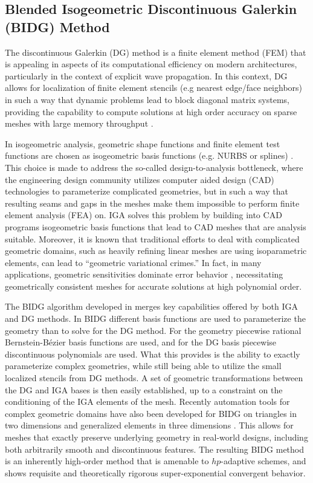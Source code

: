 \subsection{Blended Isogeometric Discontinuous Galerkin (BIDG) Method}
\label{sec:isogeometric}

The discontinuous Galerkin (DG) method is a finite element method (FEM) that is appealing in
aspects of its computational efficiency on modern architectures,
particularly in the context of explicit wave propagation.  In this context, DG allows for localization of
finite element stencils (e.g nearest edge/face neighbors) in such a way that dynamic problems lead to block
diagonal matrix systems, providing the capability to compute solutions at high order accuracy on sparse meshes with large memory throughput \cite{Klockner20097863}.

In isogeometric analysis, geometric shape functions and finite element test functions are chosen as isogeometric basis functions (e.g. NURBS or splines) \cite{Riesenfeld20151054}.  This choice is made to address the so-called design-to-analysis bottleneck, where the engineering design community utilizes computer aided design (CAD) technologies to parameterize complicated geometries, but in such a way that resulting seams and gaps in the meshes make them impossible to perform finite element analysis (FEA) on.  IGA solves this problem by building into CAD programs isogeometric basis functions that lead to CAD meshes that are analysis suitable.  Moreover, it is known that traditional efforts to deal with complicated geometric domains, such as heavily refining linear meshes are using isoparametric elements, can lead to ``geometric variational crimes.''    In fact, in many applications, geometric sensitivities dominate error behavior \cite{Michoski2016658,Wirasaet2015597,Fahs:2011:IAH:2003056.2003066,Toulorge_a2d},
necessitating geometrically consistent meshes for accurate solutions at high
polynomial order.


The BIDG algorithm developed in \cite{Michoski2016658} merges key capabilities
offered by both IGA and DG methods.  In BIDG different basis functions are used to parameterize the geometry than to solve for the DG method.  For the geometry piecewise rational Bernstein-B\'{e}zier basis functions are used, and for the DG basis piecewise discontinuous polynomials are used.  What this provides is the ability to exactly parameterize complex geometries, while still being able to utilize the small localized stencils from DG methods.   A set of geometric transformations between the DG and IGA bases is then easily established, up to a constraint on the conditioning of the IGA elements of the mesh. 
Recently automation tools for complex geometric domains have also been developed for BIDG on triangles in two dimensions \cite{Engvall2016378} and generalized elements in three dimensions \cite{EngvallPress}.  This allows for meshes that exactly
preserve underlying geometry in real-world designs, including both arbitrarily
smooth and discontinuous features. The resulting BIDG method is an inherently high-order method that is amenable to $hp$-adaptive schemes, and shows requisite and theoretically rigorous super-exponential convergent behavior.


